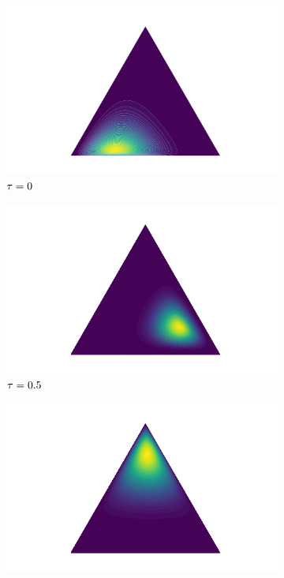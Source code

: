 \begin{figure}[H]
\centering
    \begin{subfigure}{0.25\textwidth}
        \centering
        \includegraphics[width=\linewidth]{images/0.png}
        \caption{$\tau = 0$}
    \end{subfigure}
    \hspace{-0.4cm}
    \begin{subfigure}{0.25\textwidth}
        \centering
        \includegraphics[width=\linewidth]{images/13.png}
        \caption{$\tau = 0.5$}
    \end{subfigure}
    \hspace{-0.4cm}
    \begin{subfigure}{0.25\textwidth}
        \centering
        \includegraphics[width=\linewidth]{images/33.png}

\end{subfigure}
\end{figure}
